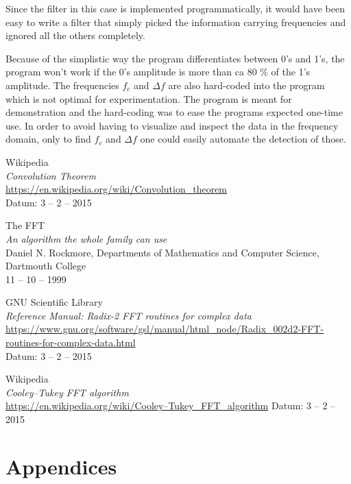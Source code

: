 \documentclass[12pt,a4paper]{article}
\begin{document}
Since the filter in this case is implemented programmatically, it would have been easy to
write a filter that simply picked the information carrying frequencies and ignored
all the others completely.

Because of the simplistic way the program differentiates between 0's and 1's, the
program won't work if the 0's amplitude is more than ca 80 \% of the 1's amplitude.
The frequencies $f_c$ and $\Delta f$ are also hard-coded into the program which
is not optimal for experimentation. The program is meant for demonstration and
the hard-coding was to ease the programs expected one-time use.
In order to avoid having to visualize and inspect the data in the frequency domain,
only to find $f_c$ and $\Delta f$ one could easily automate the detection
of those.


\clearpage
\begin{thebibliography}{99}

  Wikipedia\\
  \emph{Convolution Theorem}\\
  \url{https://en.wikipedia.org/wiki/Convolution_theorem}\\
  Datum: 3 -- 2 -- 2015

  The FFT\\
  \emph{An algorithm the whole family can use}\\
  Daniel N. Rockmore, Departments of Mathematics and Computer Science, Dartmouth College\\
  11 -- 10 -- 1999

  GNU Scientific Library\\
  \emph{Reference Manual: Radix-2 FFT routines for complex data}\\
  \url{https://www.gnu.org/software/gsl/manual/html_node/Radix_002d2-FFT-routines-for-complex-data.html}\\
  Datum: 3 -- 2 -- 2015

  Wikipedia\\
  \emph{Cooley–Tukey FFT algorithm}\\
  \url{https://en.wikipedia.org/wiki/Cooley–Tukey_FFT_algorithm}
  Datum: 3 -- 2 -- 2015


\end{thebibliography}

\appendix
\section{Appendices}
\end{document}
